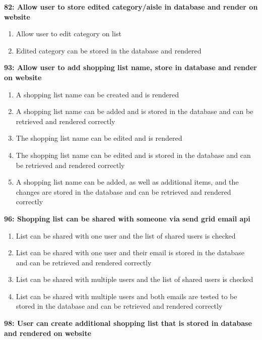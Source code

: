 \documentclass[10pt,onecolumn]{witseiepaper}
\begin{document}
\textbf{82: Allow user to store edited category/aisle in database and render on website}

\begin{enumerate}
	\item Allow user to edit category on list
	\item Edited category can be stored in the database and rendered
\end{enumerate}

\textbf{93: Allow user to add shopping list name, store in database and render on website}

\begin{enumerate}
	\item A shopping list name can be created and is rendered
	\item A shopping list name can be added and is stored in the database and can be retrieved and rendered correctly
	\item The shopping list name can be edited and is rendered
	\item The shopping list name can be edited and is stored in the database and can be retrieved and rendered correctly
	\item  A shopping list name can be added, as well as additional items, and the changes are stored in the database and can be retrieved and rendered correctly
\end{enumerate}

\textbf{96: Shopping list can be shared with someone via send grid email api}
\begin{enumerate}
	\item List can be shared with one user and the list of shared users is checked
	\item List can be shared with one user and their email is stored in the database and can be retrieved and rendered correctly
	\item List can be shared with multiple users and the list of shared users is checked
	\item List can be shared with multiple users and both emails are tested to be stored in the database and can be retrieved and rendered correctly
\end{enumerate}

%

\textbf{98: User can create additional shopping list that is stored in database and rendered on website}
\end{document}
